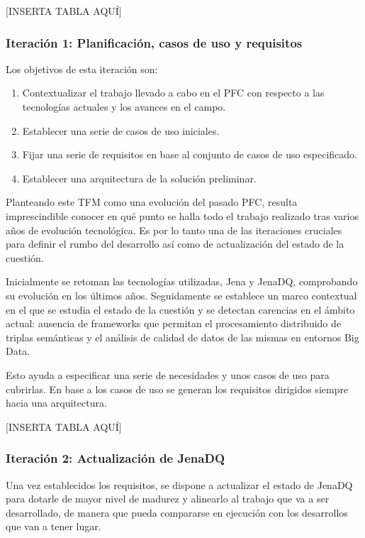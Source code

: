 [INSERTA TABLA AQUÍ]

\subsubsection{Iteración 1: Planificación, casos de uso y requisitos}

Los objetivos de esta iteración son:

\begin{enumerate}

  \item Contextualizar el trabajo llevado a cabo en el \acs{PFC} con respecto a
  las tecnologías actuales y los avances en el campo.
\item Establecer una serie de casos de uso iniciales.
\item Fijar una serie de requisitos en base al conjunto de casos de uso
  especificado.
\item Establecer una arquitectura de la solución preliminar.

\end{enumerate}

Planteando este \acs{TFM} como una evolución del pasado \acs{PFC}, resulta
imprescindible conocer en qué punto se halla todo el trabajo realizado tras
varios años de evolución tecnológica. Es por lo tanto una de las iteraciones
cruciales para definir el rumbo del desarrollo así como de actualización del
estado de la cuestión.

Inicialmente se retoman las tecnologías utilizadas, Jena y JenaDQ, comprobando
su evolución en los últimos años. Seguidamente se establece un marco contextual
en el que se estudia el estado de la cuestión y se detectan carencias en el
ámbito actual: ausencia de frameworks que permitan el procesamiento distribuido
de triplas semánticas y el análisis de calidad de datos de las mismas en
entornos Big Data. 

Esto ayuda a especificar una serie de necesidades y unos casos de uso para
cubrirlas. En base a los casos de uso se generan los requisitos dirigidos
siempre hacia una arquitectura.


[INSERTA TABLA AQUÍ]

\subsubsection{Iteración 2: Actualización de JenaDQ}

Una vez establecidos los requisitos, se dispone a actualizar el estado de JenaDQ
para dotarle de mayor nivel de madurez y alinearlo al trabajo que va a ser
desarrollado, de manera que pueda compararse en ejecución con los desarrollos
que van a tener lugar. 

